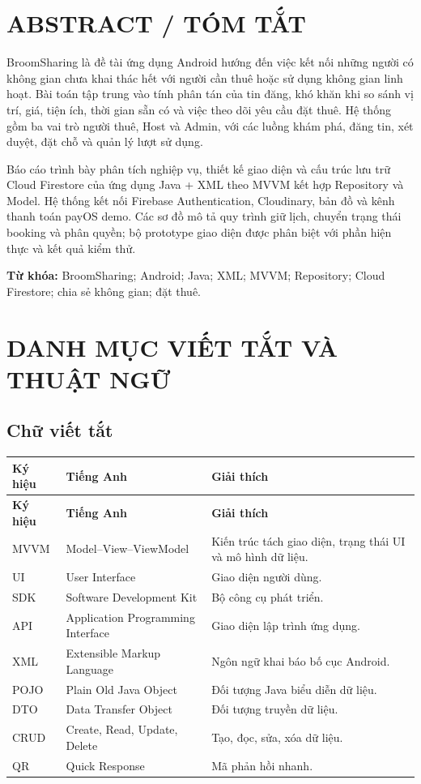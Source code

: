 \documentclass[12pt,a4paper]{article}
\numberwithin{figure}{subsection}
\numberwithin{table}{subsection}
\renewcommand{\arraystretch}{1.18}
\begin{document}
\section*{ABSTRACT / TÓM TẮT}
BroomSharing là đề tài ứng dụng Android hướng đến việc kết nối những người có không gian chưa khai thác hết với người cần thuê hoặc sử dụng không gian linh hoạt. Bài toán tập trung vào tính phân tán của tin đăng, khó khăn khi so sánh vị trí, giá, tiện ích, thời gian sẵn có và việc theo dõi yêu cầu đặt thuê. Hệ thống gồm ba vai trò người thuê, Host và Admin, với các luồng khám phá, đăng tin, xét duyệt, đặt chỗ và quản lý lượt sử dụng.

Báo cáo trình bày phân tích nghiệp vụ, thiết kế giao diện và cấu trúc lưu trữ Cloud Firestore của ứng dụng Java + XML theo MVVM kết hợp Repository và Model. Hệ thống kết nối Firebase Authentication, Cloudinary, bản đồ và kênh thanh toán payOS demo. Các sơ đồ mô tả quy trình giữ lịch, chuyển trạng thái booking và phân quyền; bộ prototype giao diện được phân biệt với phần hiện thực và kết quả kiểm thử.

\noindent\textbf{Từ khóa:} BroomSharing; Android; Java; XML; MVVM; Repository; Cloud Firestore; chia sẻ không gian; đặt thuê.
\clearpage
\section*{DANH MỤC VIẾT TẮT VÀ THUẬT NGỮ}
\begingroup\small\renewcommand{\arraystretch}{1.04}
\subsection*{Chữ viết tắt}
\begin{longtable}{@{}p{2.8cm}p{6.2cm}p{5.4cm}@{}}\toprule
\textbf{Ký hiệu}&\textbf{Tiếng Anh}&\textbf{Giải thích}\\\midrule\endfirsthead
\toprule\textbf{Ký hiệu}&\textbf{Tiếng Anh}&\textbf{Giải thích}\\\midrule\endhead
MVVM& Model--View--ViewModel & Kiến trúc tách giao diện, trạng thái UI và mô hình dữ liệu.\\
UI& User Interface & Giao diện người dùng.\\
SDK& Software Development Kit & Bộ công cụ phát triển.\\
API& Application Programming Interface & Giao diện lập trình ứng dụng.\\
XML& Extensible Markup Language & Ngôn ngữ khai báo bố cục Android.\\
POJO& Plain Old Java Object & Đối tượng Java biểu diễn dữ liệu.\\
DTO& Data Transfer Object & Đối tượng truyền dữ liệu.\\
CRUD& Create, Read, Update, Delete & Tạo, đọc, sửa, xóa dữ liệu.\\
QR& Quick Response & Mã phản hồi nhanh.\\\bottomrule\end{longtable}
\end{document}
